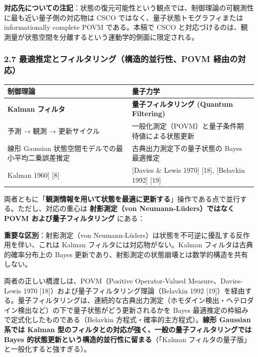 \documentclass[
]{ltjsarticle}
\newcounter{none} %
\begin{document}
\textbf{対応先についての注記}：状態の復元可能性という観点では、制御理論の可観測性に最も近い量子側の対応物は
CSCO ではなく、量子状態トモグラフィまたは informationally complete POVM
である。本稿で CSCO
と対応づけるのは、観測量が状態空間を分離するという運動学的側面に限定される。

\subsubsection{2.7 最適推定とフィルタリング（構造的並行性、POVM
経由の対応）}\label{ux6700ux9069ux63a8ux5b9aux3068ux30d5ux30a3ux30ebux30bfux30eaux30f3ux30b0ux69cbux9020ux7684ux4e26ux884cux6027povm-ux7d4cux7531ux306eux5bfeux5fdc}

{\def\LTcaptype{none} %
\begin{longtable}[]{@{}
  >{\raggedright\arraybackslash}p{}
  >{\raggedright\arraybackslash}p{}@{}}
\toprule\noalign{}
\begin{minipage}[b]{\linewidth}\raggedright
制御理論
\end{minipage} & \begin{minipage}[b]{\linewidth}\raggedright
量子力学
\end{minipage} \\
\midrule\noalign{}
\endhead
\bottomrule\noalign{}
\endlastfoot
\textbf{Kalman フィルタ} & \textbf{量子フィルタリング (Quantum
Filtering)} \\
予測 → 観測 → 更新サイクル &
一般化測定（POVM）と量子条件期待値による状態更新 \\
線形 Gaussian 状態空間モデルでの最小平均二乗誤差推定 &
古典出力測定下の量子状態の Bayes 最適推定 \\
{[}Kalman 1960{]} {[}8{]} & {[}Davies \& Lewis 1970{]} {[}18{]},
{[}Belavkin 1992{]} {[}19{]} \\
\end{longtable}
}

両者ともに「\textbf{観測情報を用いて状態を最適に更新する}」操作である点で並行する。ただし、対応の重心は
\textbf{射影測定（von Neumann-Lüders）ではなく POVM
および量子フィルタリング} にある：

\textbf{重要な区別}：射影測定（von
Neumann-Lüders）は状態を不可逆に擾乱する反作用を伴い、これは Kalman
フィルタには対応物がない。Kalman フィルタは古典的確率分布上の Bayes
更新であり、射影測定の状態崩壊とは数学的構造を共有しない。

両者の正しい橋渡しは、POVM（Positive Operator-Valued
Measure、Davies-Lewis 1970
{[}18{]}）および量子フィルタリング理論（Belavkin 1992
{[}19{]}）を経由する。量子フィルタリングは、連続的な古典出力測定（ホモダイン検出・ヘテロダイン検出など）の下で量子状態がどう更新されるかを
Bayes 最適推定の枠組みで定式化したものである（Belavkin
方程式・確率的主方程式）。\textbf{線形 Gaussian 系では Kalman
型のフィルタとの対応が強く、一般の量子フィルタリングでは Bayes
的状態更新という構造的並行性に留まる}（「Kalman
フィルタの量子版」と一般化すると強すぎる）。
\end{document}
